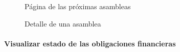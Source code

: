 \begin{figure}[H]
    \centering
    \caption{Página de las próximas asambleas}
    \label{fig:app-events}
\end{figure}

\begin{figure}[H]
    \centering
    \caption{Detalle de una asamblea}
    \label{fig:app-eventos-detalle}
\end{figure}

\paragraph{Visualizar estado de las obligaciones financieras}

